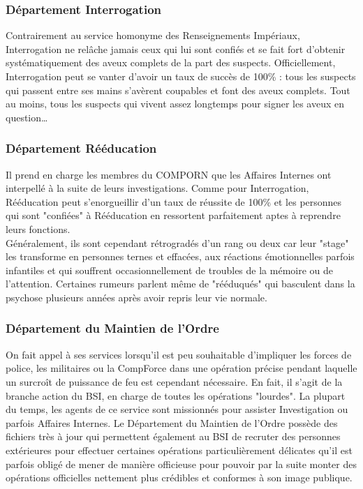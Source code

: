 \documentclass[twoside]{article}
\begin{document}
\subsubsection{Département Interrogation}
Contrairement au service homonyme des Renseignements Impériaux, Interrogation ne relâche jamais ceux qui lui sont confiés et se fait fort d'obtenir systématiquement des aveux complets de la part des suspects. Officiellement, Interrogation peut se vanter d'avoir un taux de succès de 100\% : tous les suspects qui passent entre ses mains s'avèrent coupables et font des aveux complets. Tout au moins, tous les suspects qui vivent assez longtemps pour signer les aveux en question\ldots

\subsubsection{Département Rééducation}
Il prend en charge les membres du COMPORN que les Affaires Internes ont interpellé à la suite de leurs investigations. Comme pour Interrogation, Rééducation peut s'enorgueillir d'un taux de réussite de 100\% et les personnes qui sont "confiées" à Rééducation en ressortent parfaitement aptes à reprendre leurs fonctions.\\

Généralement, ils sont cependant rétrogradés d'un rang ou deux car leur "stage" les transforme en personnes ternes et effacées, aux réactions émotionnelles parfois infantiles et qui souffrent occasionnellement de troubles de la mémoire ou de l'attention. Certaines rumeurs parlent même de "rééduqués" qui basculent dans la psychose plusieurs années après avoir repris leur vie normale.

\subsubsection{Département du Maintien de l'Ordre}
On fait appel à ses services lorsqu'il est peu souhaitable d'impliquer les forces de police, les militaires ou la CompForce dans une opération précise pendant laquelle un surcro\^{i}t de puissance de feu est cependant nécessaire. En fait, il s'agit de la branche action du BSI, en charge de toutes les opérations "lourdes". La plupart du temps, les agents de ce service sont missionnés pour assister Investigation ou parfois Affaires Internes. Le Département du Maintien de l'Ordre possède des fichiers très à jour qui permettent également au BSI de recruter des personnes extérieures pour effectuer certaines opérations particulièrement délicates qu'il est parfois obligé de mener de manière officieuse pour pouvoir par la suite monter des opérations officielles nettement plus crédibles et conformes à son image publique. 
\end{document}
